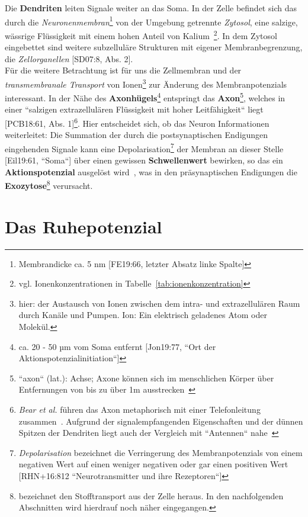 Die \textbf{Dendriten} leiten Signale weiter an das Soma.
In der Zelle befindet sich das durch die \textit{Neuronenmembran}\footnote{
 Membrandicke ca. 5 nm {[FE19:66, letzter Absatz linke Spalte]}
} von der Umgebung getrennte \textit{Zytosol}, eine salzige, wässrige Flüssigkeit mit einem hohen Anteil von Kalium~\cite[29]{BCP18}\footnote{
 vgl. Ionenkonzentrationen in Tabelle~\ref{tab:ionenkonzentration}
}.
In dem Zytosol eingebettet sind weitere subzelluläre Strukturen mit eigener Membranbegrenzung, die \textit{Zellorganellen} [SD07:8, Abs. 2].\\
Für die weitere Betrachtung ist für uns die Zellmembran und der \textit{transmembranale Transport} von Ionen\footnote{
 hier: der Austausch von Ionen zwischen dem intra- und extrazellulären Raum durch Kanäle und Pumpen. Ion: Ein elektrisch geladenes Atom oder Molekül.
} zur Änderung des Membranpotenzials interessant. In der Nähe des \textbf{Axonhügels}\footnote{
 ca. 20 - 50 µm vom Soma entfernt [Jon19:77, ``Ort der Aktionspotenzialinitiation``]
} entspringt das \textbf{Axon}\footnote{
 ``axon`` (lat.): Achse; Axone können sich im menschlichen Körper über Entfernungen von bis zu über 1m ausstrecken~\cite[28]{BCP18}
}, welches in einer ``salzigen extrazellulären Flüssigkeit mit hoher Leitfähigkeit`` liegt [PCB18:61, Abs. 1]\footnote{
  \textit{Bear et al.} führen das Axon metaphorisch mit einer Telefonleitung zusammen~\cite[43]{BCP18}. Aufgrund der signalempfangenden Eigenschaften und der dünnen Spitzen der Dendriten liegt auch der Vergleich mit ``Antennen`` nahe~\cite[28]{BCP18}
}.
Hier entscheidet sich, ob das Neuron Informationen weiterleitet: Die Summation der durch die postsynaptischen Endigungen eingehenden Signale kann eine Depolarisation\footnote{
  \textit{Depolarisation} bezeichnet die Verringerung des Membranpotenzials von einem negativen Wert auf einen weniger negativen oder gar einen positiven Wert {[RHN+16:812 ``Neurotransmitter und ihre Rezeptoren``]}
} der Membran an dieser Stelle [Eil19:61, ``Soma``] über einen gewissen \textbf{Schwellenwert} bewirken, so das ein \textbf{Aktionspotenzial} ausgelöst wird~\cite[142 f.]{BCP18}, was in den präsynaptischen Endigungen die \textbf{Exozytose}\footnote{
  bezeichnet den Stofftransport aus der Zelle heraus. In den nachfolgenden Abschnitten wird hierdrauf noch näher eingegangen.
} verursacht.


\section{Das Ruhepotenzial}

